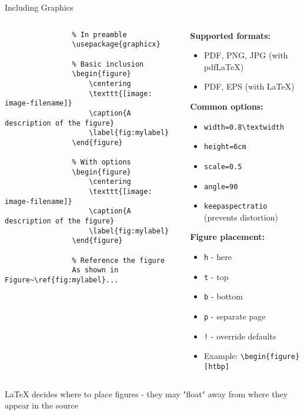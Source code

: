 \begin{frame}[fragile]{Including Graphics}
	\begin{columns}
		\begin{column}{0.5\textwidth}
			\begin{lstlisting}
				% In preamble
				\usepackage{graphicx}
				
				% Basic inclusion
				\begin{figure}
					\centering
					\texttt{[image: image-filename]}
					\caption{A description of the figure}
					\label{fig:mylabel}
				\end{figure}
				
				% With options
				\begin{figure}
					\centering
					\texttt{[image: image-filename]}
					\caption{A description of the figure}
					\label{fig:mylabel}
				\end{figure}
				
				% Reference the figure
				As shown in Figure~\ref{fig:mylabel}...
			\end{lstlisting}
		\end{column}
		
		\begin{column}{0.5\textwidth}
			\textbf{Supported formats:}
			\begin{itemize}
				\item PDF, PNG, JPG (with pdfLaTeX)
				\item PDF, EPS (with LaTeX)
			\end{itemize}
			
			\textbf{Common options:}
			\begin{itemize}
				\item \texttt{width=0.8\textbackslash textwidth}
				\item \texttt{height=6cm}
				\item \texttt{scale=0.5}
				\item \texttt{angle=90}
				\item \texttt{keepaspectratio} (prevents distortion)
			\end{itemize}
			
			\textbf{Figure placement:}
			\begin{itemize}
				\item \texttt{h} - here
				\item \texttt{t} - top
				\item \texttt{b} - bottom
				\item \texttt{p} - separate page
				\item \texttt{!} - override defaults
				\item Example: \texttt{\textbackslash begin\{figure\}[htbp]}
			\end{itemize}
		\end{column}
	\end{columns}
	
	\begin{warning}
		LaTeX decides where to place figures - they may "float" away from where they appear in the source
	\end{warning}
\end{frame}

